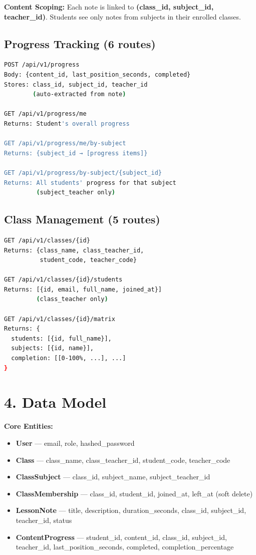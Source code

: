 \documentclass[11pt,a4paper]{article}
\begin{document}
\textbf{Content Scoping:} Each note is linked to \textbf{(class\_id, subject\_id, teacher\_id)}. Students see only notes from subjects in their enrolled classes.

\subsection*{Progress Tracking (6 routes)}
\begin{lstlisting}[language=bash]
POST /api/v1/progress
Body: {content_id, last_position_seconds, completed}
Stores: class_id, subject_id, teacher_id 
        (auto-extracted from note)

GET /api/v1/progress/me
Returns: Student's overall progress

GET /api/v1/progress/me/by-subject
Returns: {subject_id → [progress items]}

GET /api/v1/progress/by-subject/{subject_id}
Returns: All students' progress for that subject
         (subject_teacher only)
\end{lstlisting}

\subsection*{Class Management (5 routes)}
\begin{lstlisting}[language=bash]
GET /api/v1/classes/{id}
Returns: {class_name, class_teacher_id, 
          student_code, teacher_code}

GET /api/v1/classes/{id}/students
Returns: [{id, email, full_name, joined_at}]
         (class_teacher only)

GET /api/v1/classes/{id}/matrix
Returns: {
  students: [{id, full_name}],
  subjects: [{id, name}],
  completion: [[0-100%, ...], ...]
}
\end{lstlisting}

\section*{4. Data Model}

\textbf{Core Entities:}
\begin{itemize}
    \item \textbf{User} — email, role, hashed\_password
    \item \textbf{Class} — class\_name, class\_teacher\_id, student\_code, teacher\_code
    \item \textbf{ClassSubject} — class\_id, subject\_name, subject\_teacher\_id
    \item \textbf{ClassMembership} — class\_id, student\_id, joined\_at, left\_at (soft delete)
    \item \textbf{LessonNote} — title, description, duration\_seconds, class\_id, subject\_id, teacher\_id, status
    \item \textbf{ContentProgress} — student\_id, content\_id, class\_id, subject\_id, teacher\_id, last\_position\_seconds, completed, completion\_percentage
\end{itemize}
\end{document}
